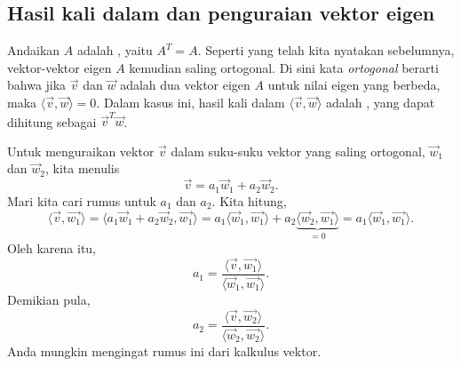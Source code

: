 \subsection{Hasil kali dalam dan penguraian vektor eigen}

Andaikan $A$ adalah \emph{},
yaitu $A^T = A$.  Seperti yang telah kita nyatakan sebelumnya,
vektor-vektor eigen $A$ kemudian saling ortogonal.  Di sini kata
\emph{ortogonal} berarti
bahwa jika $\vec{v}$ dan $\vec{w}$ adalah dua
vektor eigen $A$ untuk nilai eigen yang berbeda,
maka $\langle \vec{v} , \vec{w} \rangle = 0$.
Dalam kasus ini, hasil kali dalam $\langle \vec{v} , \vec{w} \rangle$
adalah \emph{},
yang dapat dihitung sebagai $\vec{v}^T\vec{w}$.

Untuk menguraikan vektor $\vec{v}$ dalam suku-suku vektor yang saling ortogonal,
$\vec{w}_1$ dan $\vec{w}_2$, kita menulis
\begin{equation*}
\vec{v} = a_1 \vec{w}_1  + a_2 \vec{w}_2 .
\end{equation*}
Mari kita cari rumus untuk $a_1$ dan $a_2$.  Kita hitung,
\begin{equation*}
\langle \vec{v} , \vec{w_1} \rangle
=
\langle a_1 \vec{w}_1  + a_2 \vec{w}_2 , \vec{w_1} \rangle
=
a_1 \langle \vec{w}_1 , \vec{w_1} \rangle
+
a_2 \underbrace{\langle \vec{w}_2 , \vec{w_1} \rangle}_{=0}
=
a_1 \langle \vec{w}_1 , \vec{w_1} \rangle .
\end{equation*}
Oleh karena itu,
\begin{equation*}
a_1 = 
\frac{\langle \vec{v} , \vec{w_1} \rangle}{
\langle \vec{w}_1 , \vec{w_1} \rangle} .
\end{equation*}
Demikian pula,
\begin{equation*}
a_2 = 
\frac{\langle \vec{v} , \vec{w_2} \rangle}{
\langle \vec{w}_2 , \vec{w_2} \rangle} .
\end{equation*}
Anda mungkin mengingat rumus ini dari kalkulus vektor.

